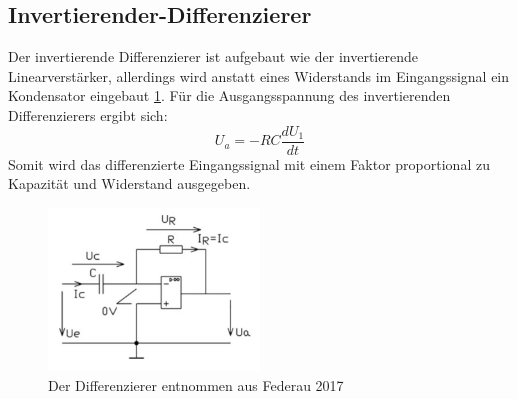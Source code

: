    \subsection{Invertierender-Differenzierer}
        Der invertierende Differenzierer ist aufgebaut wie der invertierende Linearverstärker, allerdings wird anstatt eines Widerstands im Eingangssignal ein Kondensator eingebaut \ref{fig:differenzierer}.
        Für die Ausgangsspannung des invertierenden Differenzierers ergibt sich:
        \begin{equation*}
            U_a = -RC \frac{dU_1}{dt}
        \end{equation*}
        Somit wird das differenzierte Eingangssignal mit einem Faktor proportional zu Kapazität und Widerstand ausgegeben.
        \begin{figure}[ht]
            \centering
            \includegraphics[width = 0.5\textwidth]{bilder/differenzierer.png}
            \caption{Der Differenzierer entnommen aus Federau 2017}
            \label{fig:differenzierer}
        \end{figure}
